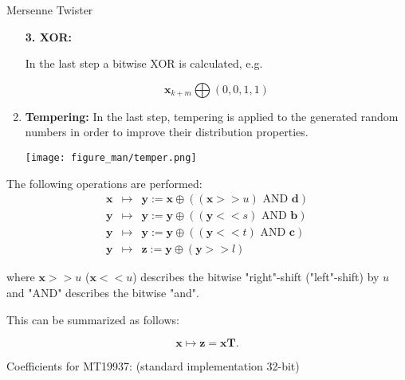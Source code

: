 \documentclass[11pt,compress,t,notes=noshow, xcolor=table]{beamer}
\begin{document}
\begin{vbframe}{Mersenne Twister}
\begin{enumerate}
\begin{footnotesize}
\lz

\textbf{3. XOR: }


In the last step a bitwise XOR is calculated, e.g.

$$
\mathbf{x}_{k + m} \bigoplus (0, 0, 1, 1)
$$
\end{footnotesize}

\framebreak

\item \textbf{Tempering:}  In the last step, tempering is applied to the generated random numbers in order to improve their distribution properties.

\vspace*{0.2cm}

\begin{center}
	\texttt{[image: figure\_man/temper.png]}
\end{center}
\end{enumerate}

\framebreak

The following operations are performed:
\vspace*{-0.2cm}
\begin{eqnarray*}
\mathbf{x} &\mapsto& \mathbf{y} := \mathbf{x} \oplus ((\mathbf{x} >> u) \text{ AND } \mathbf{d}) \\ \mathbf{y} &\mapsto& \mathbf{y} := \mathbf{y} \oplus ((\mathbf{y} << s) \text{ AND } \mathbf{b}) \\
\mathbf{y} &\mapsto& \mathbf{y} := \mathbf{y} \oplus ((\mathbf{y} < < t) \text{ AND } \mathbf{c}) \\ \mathbf{y} &\mapsto& \mathbf{z} := \mathbf{y} \oplus (\mathbf{y} >> l)
\end{eqnarray*}

where $\mathbf{x} >> u$ ($\mathbf{x} << u$) describes the bitwise "right"-shift ("left"-shift) by $u$ and "AND" describes the bitwise "and".

\lz

This can be summarized as follows:

$$\mathbf{x} \mapsto \mathbf{z} = \mathbf{x}\mathbf{T}. $$


\framebreak

Coefficients for MT19937: (standard implementation 32-bit)


\end{vbframe}
\end{document}
